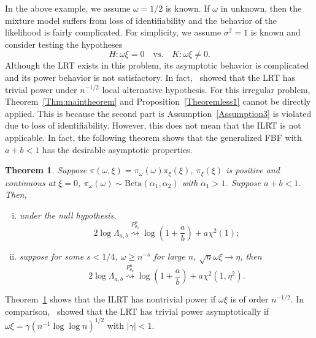 \documentclass[11pt]{article}
\theoremstyle{plain}
\newtheorem{theorem}{\quad\quad Theorem}
\theoremstyle{definition}
\theoremstyle{remark}
\begin{document}
In the above example, we assume $\omega=1/2$ is known.
If $\omega$ in unknown, then the mixture model suffers from loss of identifiability and the behavior of the likelihood is fairly complicated.
For simplicity, we assume $\sigma^2=1$ is known and consider testing the hypotheses
\begin{equation}
    H:\omega \xi=0
    \quad \text{vs.}\quad
    K:\omega \xi \neq 0.
    \label{newHy}
\end{equation}
Although the LRT exists in this problem, its asymptotic behavior is complicated and its power behavior is not satisfactory.
In fact,~\cite{HALL2005158} showed that the LRT has trivial power under $n^{-1/2}$ local alternative hypothesis. 
For this irregular problem, Theorem~\ref{Thm:maintheorem} and Proposition~\ref{Theoremless1} cannot be directly applied.
This is because the second part is Assumption~\eqref{Assumption3} is violated due to loss of identifiability.
However, this does not mean that the ILRT is not applicable.
In fact, the following theorem shows that the generalized FBF with $a+b<1$ has the desirable asymptotic properties.

\begin{theorem}
    Suppose $\pi(\omega,\xi)=\pi_{\omega}(\omega) \pi_{\xi}(\xi)$, $\pi_\xi(\xi)$ is positive and continuous at $\xi=0$,
    $\pi_\omega(\omega)\sim \text{Beta}(\alpha_1,\alpha_2)$ with $\alpha_1>1$.
    Suppose $a+b<1$.
    Then,
    \begin{enumerate}[(i)]
        \item
    under the null hypothesis,
    \begin{equation*}
        2\log \Lambda_{a,b} \overset{P^n_{\theta_0}}{\rightsquigarrow}\log(1+\frac a b)+ a\chi^2(1);
    \end{equation*}
\item
    suppose for some $s<1/4$, $\omega \geq n^{-s}$ for large $n$, $\sqrt{n}\omega \xi \to \eta$, then
    \begin{equation*}
        2\log \Lambda_{a,b} \overset{P^n_{\theta_n}}{\rightsquigarrow}\log(1+\frac a b)+ a\chi^2(1,\eta^2).
    \end{equation*}
\end{enumerate}
    \label{mixtureThm}
\end{theorem}
Theorem~\ref{mixtureThm} shows that the ILRT has nontrivial power if $\omega \xi $ is of order $n^{-1/2}$. 
In comparison,~\cite{HALL2005158} showed that the LRT has  trivial power asymptotically if $\omega \xi=\gamma(n^{-1}\log \log n)^{1/2}$ with $|\gamma|< 1$.
\end{document}
